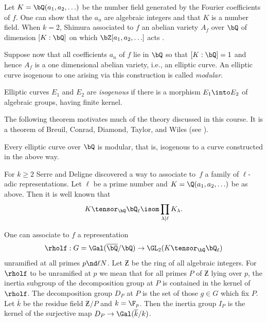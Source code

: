 \documentclass{report}
\begin{document}
Let $K=\bQ(a_1,a_2,\ldots)$ be the number field generated by the
Fourier coefficients of $f$. One can show that the $a_n$ are algebraic
integers and that $K$ is a number field.  When $k=2$,
Shimura associated to $f$ an abelian variety $A_f$ over
$\bQ$ of dimension $[K:\bQ]$ on which $\bZ[a_1,a_2,\ldots]$ acts
\cite[Theorem 7.14]{shimura:intro}.

\begin{example}
 Suppose now that all coefficients $a_n$ of $f$ lie in $\bQ$ so that
$[K:\bQ]=1$ and hence $A_f$ is a one dimensional abelian variety,
i.e., an elliptic curve.  An elliptic curve isogenous to one arising
via this construction is called {\em modular}.
\end{example}

\begin{defn}
Elliptic curves $E_1$ and $E_2$ are {\em isogenous} if there is
a morphism $E_1\into E_2$ of algebraic groups, having
finite kernel.
\end{defn}

The following theorem motivates much of the theory discussed in this
course.  It is a theorem of Breuil, Conrad, Diamond, Taylor, and Wiles
(see \cite{breuil-conrad-diamond-taylor}).

\begin{theorem}
Every elliptic curve over $\bQ$ is modular,
that is, isogenous to a curve constructed in the above way.
\end{theorem}

For $k\geq 2$ Serre and Deligne discovered a way to associate
to~$f$ a family of $\ell$-adic representations. Let $\ell$ be a prime number
and $K=\Q(a_1,a_2,\ldots)$ be as above. Then it is well known that
  $$K\tensor_{\bQ} \bQ_{\ell}\isom \prod_{\lambda|\ell}K_{\lambda}.$$

One can associate to $f$ a representation
\begin{equation*}
\rholf:G=\Gal(\overline{\bQ}/\bQ)
\rightarrow\GL_2(K\tensor_{\bQ}\bQ_{\ell})
\end{equation*}
unramified at all primes $p\nd \ell N$.  Let $\Zbar$ be the ring of
all algebraic integers.  For $\rholf$ to be unramified at $p$ we mean
that for all primes $P$ of $\Zbar$ lying over $p$, the inertia
subgroup of the decomposition group at $P$ is contained in the kernel
of $\rholf$. The decomposition group $D_P$ at $P$ is the set of those
$g\in G$ which fix $P$. Let $\overline{k}$ be the residue field
$\Zbar/P$ and $k=\F_p$.  Then the inertia group $I_P$ is the kernel of
the surjective map $D_P\rightarrow \Gal(\overline{k}/k)$.
\end{document}
